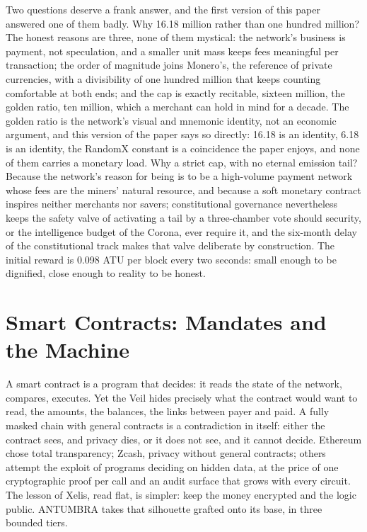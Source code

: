 Two questions deserve a frank answer, and the first version of this
paper answered one of them badly. Why 16.18 million rather than one
hundred million? The honest reasons are three, none of them mystical:
the network's business is payment, not speculation, and a
smaller unit mass keeps fees meaningful per transaction; the order of
magnitude joins Monero's, the reference of private currencies, with a
divisibility of one hundred million that keeps counting comfortable at
both ends; and the cap is exactly recitable, sixteen million, the
golden ratio, ten million, which a merchant can hold in mind for a
decade. The golden ratio is the network's visual and mnemonic identity,
not an economic argument, and this version of the paper says so
directly: 16.18 is an identity, 6.18 is an identity, the RandomX
constant is a coincidence the paper enjoys, and none of them carries a
monetary load. Why a
strict cap, with no eternal emission tail? Because the network's reason
for being is to be a high-volume payment network whose fees are the
miners' natural resource, and because a soft monetary contract inspires
neither merchants nor savers; constitutional governance nevertheless
keeps the safety valve of activating a tail by a three-chamber vote
should security, or the intelligence budget of the Corona, ever require
it, and the six-month delay of the constitutional track makes that valve
deliberate by construction. The initial reward is 0.098 ATU per
block every two seconds: small enough to be dignified, close enough to
reality to be honest.

\section{Smart Contracts: Mandates and the Machine}\label{sec:contracts}

A smart contract is a program that decides: it reads the state of the
network, compares, executes. Yet the Veil hides precisely what the
contract would want to read, the amounts, the balances, the links
between payer and paid. A fully masked chain with general contracts is
a contradiction in itself: either the contract sees, and privacy dies,
or it does not see, and it cannot decide. Ethereum chose total
transparency; Zcash, privacy without general contracts; others attempt
the exploit of programs deciding on hidden data, at the price of one
cryptographic proof per call and an audit surface that grows with every
circuit. The lesson of Xelis, read flat, is simpler: keep the money
encrypted and the logic public. ANTUMBRA takes that silhouette grafted
onto its base, in three bounded tiers.

